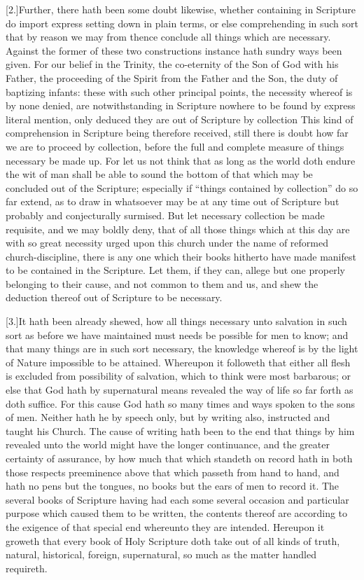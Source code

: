 [2.]Further, there hath been some doubt likewise, whether containing in Scripture do import express setting down in plain terms, or else comprehending in such sort that by reason we may from thence conclude all things which are necessary. Against the former of these two constructions instance hath sundry ways been given. For our belief in the Trinity, the co-eternity of the Son of God with his Father, the proceeding of the Spirit from the Father and the Son, the duty of baptizing infants: these with such  other principal points, the necessity whereof is by none denied, are notwithstanding in Scripture nowhere to be found by express literal mention, only deduced they are out of Scripture by collection This kind of comprehension in Scripture being therefore received, still there is doubt how far we are to proceed by collection, before the full and complete measure of things necessary be made up. For let us not think that as long as the world doth endure the wit of man shall be able to sound the bottom of that which may be concluded out of the Scripture; especially if “things contained by collection” do so far extend, as to draw in whatsoever may be at any time out of Scripture but probably and conjecturally surmised. But let necessary collection be made requisite, and we may boldly deny, that of all those things which at this day are with so great necessity urged upon this church under the name of reformed church-discipline, there is any one which their books hitherto have made manifest to be contained in the Scripture. Let them, if they can, allege but one properly belonging to their cause, and not common to them and us, and shew the deduction thereof out of Scripture to be necessary.

[3.]It hath been already shewed, how all things necessary unto salvation in such sort as before we have maintained must needs be possible for men to know; and that many things are in such sort necessary, the knowledge whereof is by the light of Nature impossible to be attained. Whereupon it followeth that either all flesh is excluded from possibility of salvation, which to think were most barbarous; or else that God hath by supernatural means revealed the way of life so far forth as doth suffice. For this cause God hath so many times and ways spoken to the sons of men. Neither hath he by speech only, but by writing also, instructed and taught his Church. The cause of writing hath been to the end that things by him revealed unto the world might have the longer continuance, and the greater certainty of assurance, by how much that which standeth on record hath in both those respects preeminence above that which passeth from hand to hand, and hath no pens but the tongues, no books but the ears of men to record it. The several books of Scripture having had each some several occasion and particular purpose which  caused them to be written, the contents thereof are according to the exigence of that special end whereunto they are intended. Hereupon it groweth that every book of Holy Scripture doth take out of all kinds of truth, natural, historical, foreign, supernatural, so much as the matter handled requireth.

